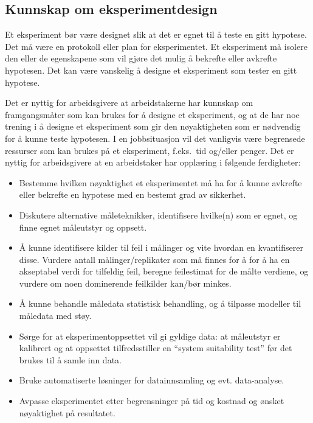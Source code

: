 \documentclass{article}
\begin{document}
\subsection{Kunnskap om eksperimentdesign}
Et eksperiment bør være designet slik at det er egnet til å teste en gitt hypotese.
Det må være en protokoll eller plan for eksperimentet.
Et eksperiment må isolere den eller de egenskapene som vil gjøre det mulig å bekrefte eller avkrefte hypotesen.
Det kan være vanskelig å designe et eksperiment som tester en gitt hypotese.

Det er nyttig for arbeidsgivere at arbeidstakerne har kunnskap om framgangsmåter som kan brukes for å designe et eksperiment, og at de har noe trening i å designe et eksperiment som gir den nøyaktigheten som er nødvendig for å kunne teste hypotesen. I en jobbsituasjon vil det vanligvis være begrensede ressurser som kan brukes på et eksperiment, f.eks.~tid og/eller penger.
Det er nyttig for arbeidsgivere at en arbeidstaker har opplæring i følgende ferdigheter:
\begin{itemize}
  \item Bestemme hvilken nøyaktighet et eksperimentet må ha for å kunne avkrefte eller bekrefte en hypotese med en bestemt grad av sikkerhet.
  \item Diskutere alternative måleteknikker, identifisere hvilke(n) som er egnet, og finne egnet måleutstyr og oppsett.
  \item Å kunne identifisere kilder til feil i målinger og vite hvordan en kvantifiserer disse. Vurdere antall målinger/replikater som må finnes for å for å ha en akseptabel verdi for tilfeldig feil, beregne feilestimat for de målte verdiene, og vurdere om noen dominerende feilkilder kan/bør minkes.
  \item Å kunne behandle måledata statistisk behandling, og å tilpasse modeller til måledata med støy.
  \item Sørge for at eksperimentoppsettet vil gi gyldige data: at måleutstyr er kalibrert og at oppsettet tilfredsstiller en ``system suitability test'' før det brukes til å samle inn data.
  \item Bruke automatiserte løsninger for datainnsamling og evt. data-analyse.
  \item Avpasse eksperimentet etter begrensninger på tid og kostnad og ønsket nøyaktighet på resultatet.
\end{itemize}
\end{document}
